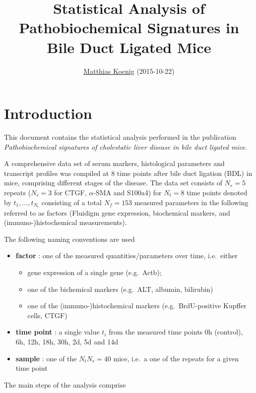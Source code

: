 \documentclass[]{article}
\title{Statistical Analysis of Pathobiochemical Signatures in Bile Duct Ligated
Mice}
\author{\href{http://www.charite.de/sysbio/people/koenig}{Matthias Koenig}
(2015-10-22)}
\date{}
\begin{document}
\maketitle


{
\hypersetup{linkcolor=black}
\setcounter{tocdepth}{2}
\tableofcontents
}
\section{Introduction}\label{introduction}

This document contains the statistical analysis performed in the
publication \emph{Pathobiochemical signatures of cholestatic liver
disease in bile duct ligated mice}.

A comprehensive data set of serum markers, histological parameters and
transcript profiles was compiled at 8 time points after bile duct
ligation (BDL) in mice, comprising different stages of the disease. The
data set consists of \(N_{r}=5\) repeats (\(N_{r}=3\) for CTGF,
\(\alpha\)-SMA and S100a4) for \(N_{t}=8\) time points denoted by
\(t_1,..., t_{N_t}\) consisting of a total \(N_{f}=153\) measured
parameters in the following referred to as factors (Fluidigm gene
expression, biochemical markers, and (immuno-)histochemical
measurements).

The following naming conventions are used

\begin{itemize}
\itemsep1pt\parskip0pt
\item
  \textbf{factor} : one of the measured quantities/parameters over time,
  i.e.~either

  \begin{itemize}
  \itemsep1pt\parskip0pt
  \item
    gene expression of a single gene (e.g.~Actb);
  \item
    one of the bichemical markers (e.g.~ALT, albumin, bilirubin)
  \item
    one of the (immuno-)histochemical markers (e.g.~BrdU-positive
    Kupffer cells, CTGF)
  \end{itemize}
\item
  \textbf{time point} : a single value \(t_i\) from the measured time
  points 0h (control), 6h, 12h, 18h, 30h, 2d, 5d and 14d
\item
  \textbf{sample} : one of the \(N_{t}N_{r}=40\) mice, i.e.~a one of the
  repeats for a given time point
\end{itemize}

The main steps of the analysis comprise
\end{document}
